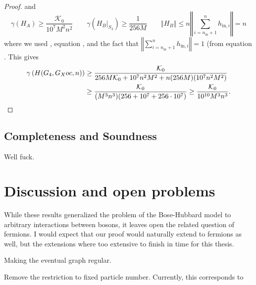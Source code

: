 \documentclass[../thesis-main/thesis-main]{subfiles}
\begin{document}
\begin{proof}
and
\begin{equation}
  \gamma(H_{A}) \geq \frac{\mathcal{K}_0}{10^7 M^{2}n^{2}} \qquad
  \gamma(H_{B}|_{S_{3}})\geq\frac{1}{256M} \qquad 
  \left\Vert H_{B}\right\Vert 
    \leq n\left\Vert \sum_{i=n_{\text{in}}+1}^{n}h_{\text{in},i}\right\Vert = n
\end{equation}
where we used , equation , and the fact that $\left\Vert \sum_{i=n_{\text{in}}+1}^{n}h_{\text{in},i}\right\Vert =1$ (from equation . This gives
\begin{align}
\gamma \left(H(G_4,G_Xoc,n)\right)
&\geq \frac{\mathcal{K}_0}{256M\mathcal{K}_0+10^7n^2M^2+n(256M)(10^7n^2M^2)} \\
&\geq \frac{\mathcal{K}_0}{(M^3n^3)(256+10^7+256\cdot 10^7)}
 \geq \frac{\mathcal{K}_0}{10^{10} M^3n^3}. \qedhere
\end{align}
\end{proof}






\subsection{Completeness and Soundness}

Well fuck.


\section{Discussion and open problems}

While these results generalized the problem of the Bose-Hubbard model to arbitrary interactions between bosons, it leaves open the related question of fermions.  I would expect that our proof would naturally extend to fermions as well, but the extensions where too extensive to finish in time for this thesis.

Making the eventual graph regular.

Remove the restriction to fixed particle number.  Currently, this corresponds to 

\biblio
\end{document}
